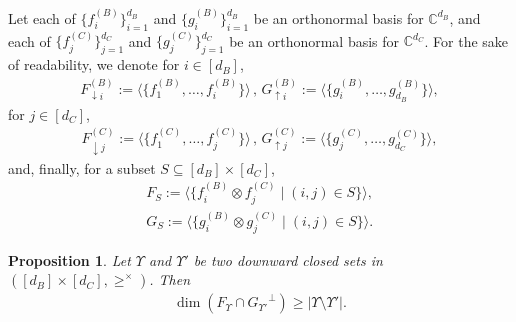 \documentclass[12pt]{article}
\newtheorem{prop}[thm]{Proposition}
\theoremstyle{definition}
\numberwithin{equation}{section}
\numberwithin{equation}{section}
\newcommand{\Ups}{\Upsilon}
\newcommand{\da}{\downarrow}
\newcommand{\ua}{\uparrow}
\newcommand{\bC}{\mathbb{C}}
\begin{document}
Let each of \(\{f_i^{(B)}\}_{i=1}^{d_B}\) and \(\{ g_i^{(B)}\}_{i=1}^{d_B}\) be an orthonormal basis for \(\bC^{d_B}\), and each of \(\{f_j^{(C)}\}_{j=1}^{d_C}\) and \(\{ g_j^{(C)}\}_{j=1}^{d_C}\) be an orthonormal basis for \(\bC^{d_C}\). For the sake of readability, we denote for \(i \in [d_B]\),
\begin{align}
F^{(B)}_{\da i} := \langle \{f^{(B)}_1, \ldots, f^{(B)}_{i}\} \rangle \, , \, G^{(B)}_{\ua i} := \langle \{g_i^{(B)}, \ldots, g_{d_B}^{(B)}\} \rangle,   
\end{align}
for \(j \in [d_C]\), 
\begin{align}
F^{(C)}_{\da j} := \langle \{f^{(C)}_1, \ldots, f^{(C)}_{j}\} \rangle \, , \, G^{(C)}_{\ua j} := \langle \{ g^{(C)}_{j}, \ldots, g^{(C)}_{d_C} \} \rangle,
\end{align}
and, finally, for a subset \(S \subseteq [d_B] \times [d_C]\),
\begin{align}
F_S := \langle \{ f_i^{(B)} \otimes f_j^{(C)} \mid (i, j) \in S \}\rangle, \\
G_S := \langle \{ g_i^{(B)} \otimes g_j^{(C)} \mid (i, j) \in S \}\rangle.
\end{align}

\begin{prop}
\label{prop: orthogonal tensor products} 
Let \(\Ups\) and \(\Ups'\) be two downward closed sets in \(([d_B] \times [d_C], \geq^\times)\). Then
\begin{align}
\label{eq: dim inequality for plane}
\dim(F_{\Ups} \cap {G_{\Ups'}}^\perp) \geq |\Ups \setminus \Ups'|.    
\end{align}
\end{prop}
\end{document}
